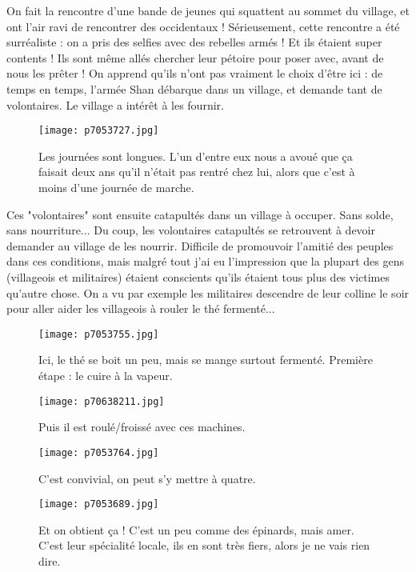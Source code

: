 \documentclass{book}
\begin{document}
On fait la rencontre d'une bande de jeunes qui squattent au sommet du village, et ont l'air ravi de rencontrer des occidentaux ! Sérieusement, cette rencontre a été surréaliste : on a pris des selfies avec des rebelles armés ! Et ils étaient super contents ! Ils sont même allés chercher leur pétoire pour poser avec, avant de nous les prêter ! On apprend qu'ils n'ont pas vraiment le choix d'être ici : de temps en temps, l'armée Shan débarque dans un village, et demande tant de volontaires. Le village a intérêt à les fournir.


\begin{figure}[h]
\centering
\texttt{[image: p7053727.jpg]}
\caption*{Les journées sont longues. L'un d'entre eux nous a avoué que ça faisait deux ans qu'il n'était pas rentré chez lui, alors que c'est à moins d'une journée de marche.}
\end{figure}

Ces "volontaires" sont ensuite catapultés dans un village à occuper. Sans solde, sans nourriture... Du coup, les volontaires catapultés se retrouvent à devoir demander au village de les nourrir. Difficile de promouvoir l'amitié des peuples dans ces conditions, mais malgré tout j'ai eu l'impression que la plupart des gens (villageois et militaires) étaient conscients qu'ils étaient tous plus des victimes qu'autre chose. On a vu par exemple les militaires descendre de leur colline le soir pour aller aider les villageois à rouler le thé fermenté...


\begin{figure}[h]
\centering
\texttt{[image: p7053755.jpg]}
\caption*{Ici, le thé se boit un peu, mais se mange surtout fermenté. Première étape : le cuire à la vapeur.}
\end{figure}


\begin{figure}[h]
\centering
\texttt{[image: p70638211.jpg]}
\caption*{Puis il est roulé/froissé avec ces machines.}
\end{figure}


\begin{figure}[h]
\centering
\texttt{[image: p7053764.jpg]}
\caption*{C'est convivial, on peut s'y mettre à quatre.}
\end{figure}


\begin{figure}[h]
\centering
\texttt{[image: p7053689.jpg]}
\caption*{Et on obtient ça ! C'est un peu comme des épinards, mais amer. C'est leur spécialité locale, ils en sont très fiers, alors je ne vais rien dire.}
\end{figure}
\end{document}
